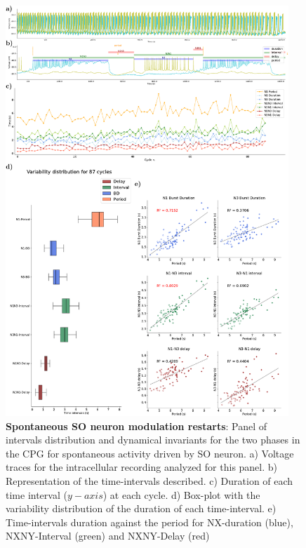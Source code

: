 \begin{figure}[htbp]
	\centering
	\includegraphics[width=0.95\textwidth]{./img/invariants/data/SUSSEX/prep4_so_driven_2/images/panel_with_intervals.pdf}
	\caption{\textbf{Spontaneous SO neuron modulation restarts}: Panel of intervals distribution and dynamical invariants for the two phases in the CPG for spontaneous activity driven by SO neuron. a) Voltage traces for the intracellular recording analyzed for this panel. b) Representation of the time-intervals described. c) Duration of each time interval ($y-axis$) at each cycle. d) Box-plot with the variability distribution of the duration of each time-interval. e) Time-intervals duration against the period for NX-duration (blue), NXNY-Interval (green) and NXNY-Delay (red)}
	\label{fig:so spontaneous invariants 1}
\end{figure}


